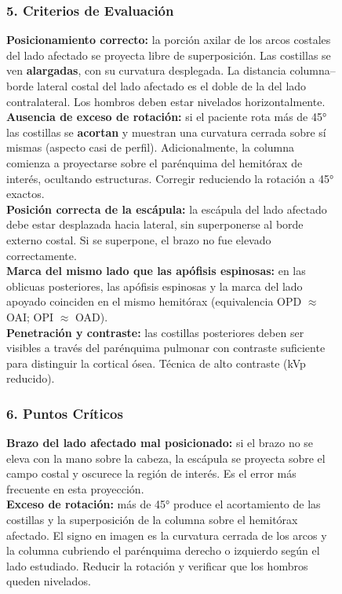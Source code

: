 \begin{figure}
{%
\subsubsection*{5. Criterios de Evaluación}

\textbf{Posicionamiento correcto:} la porción axilar de los arcos costales del lado afectado se proyecta libre de superposición. Las costillas se ven \textbf{alargadas}, con su curvatura desplegada. La distancia columna--borde lateral costal del lado afectado es el doble de la del lado contralateral. Los hombros deben estar nivelados horizontalmente.\\

\textbf{Ausencia de exceso de rotación:} si el paciente rota más de 45° las costillas se \textbf{acortan} y muestran una curvatura cerrada sobre sí mismas (aspecto casi de perfil). Adicionalmente, la columna comienza a proyectarse sobre el parénquima del hemitórax de interés, ocultando estructuras. Corregir reduciendo la rotación a 45° exactos.\\

\textbf{Posición correcta de la escápula:} la escápula del lado afectado debe estar desplazada hacia lateral, sin superponerse al borde externo costal. Si se superpone, el brazo no fue elevado correctamente.\\

\textbf{Marca del mismo lado que las apófisis espinosas:} en las oblicuas posteriores, las apófisis espinosas y la marca del lado apoyado coinciden en el mismo hemitórax (equivalencia OPD $\approx$ OAI; OPI $\approx$ OAD).\\

\textbf{Penetración y contraste:} las costillas posteriores deben ser visibles a través del parénquima pulmonar con contraste suficiente para distinguir la cortical ósea. Técnica de alto contraste (kVp reducido).

\subsubsection*{6. Puntos Críticos}

\textbf{Brazo del lado afectado mal posicionado:} si el brazo no se eleva con la mano sobre la cabeza, la escápula se proyecta sobre el campo costal y oscurece la región de interés. Es el error más frecuente en esta proyección.\\

\textbf{Exceso de rotación:} más de 45° produce el acortamiento de las costillas y la superposición de la columna sobre el hemitórax afectado. El signo en imagen es la curvatura cerrada de los arcos y la columna cubriendo el parénquima derecho o izquierdo según el lado estudiado. Reducir la rotación y verificar que los hombros queden nivelados.\\

}
\end{figure}
